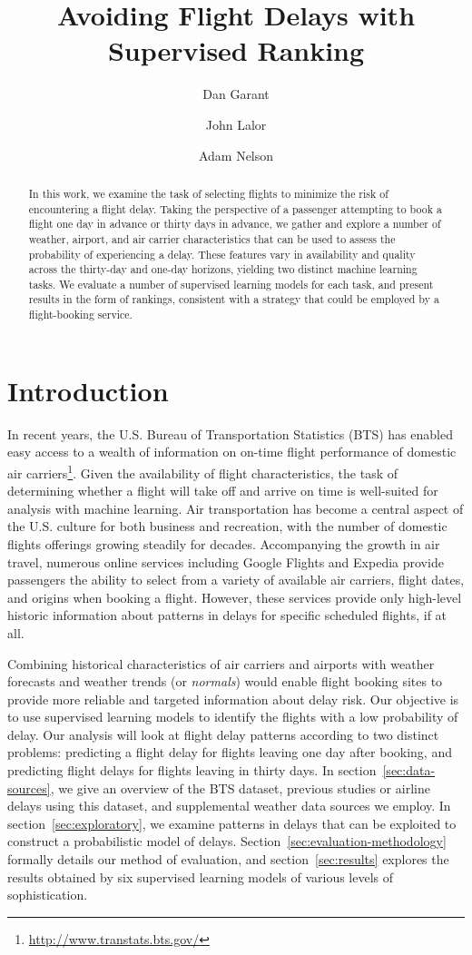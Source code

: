 \documentclass[twocolumn]{article}
\title{Avoiding Flight Delays with Supervised Ranking}
\author{Dan Garant \and John Lalor \and Adam Nelson}
\date{}
\begin{document}
\maketitle

\begin{abstract}
In this work, we examine the task of selecting flights to minimize the risk of encountering a flight delay.
Taking the perspective of a passenger attempting to book a flight one day in advance or thirty days in advance, we gather and explore a number of weather, airport, and air carrier characteristics that can be used to assess the probability of experiencing a delay.
These features vary in availability and quality across the thirty-day and one-day horizons, yielding two distinct machine learning tasks.
We evaluate a number of supervised learning models for each task, and present results in the form of rankings, consistent with a strategy that could be employed by a flight-booking service.
\end{abstract}

\section{Introduction}

In recent years, the U.S. Bureau of Transportation Statistics (BTS)  has enabled easy access to a wealth of information on on-time flight performance of domestic air carriers\footnote{\url{http://www.transtats.bts.gov/}}.
Given the availability of flight characteristics, the task of determining whether a flight will take off and arrive on time is well-suited for analysis with machine learning.
Air transportation has become a central aspect of the U.S. culture for both business and recreation, with the number of domestic flights offerings growing steadily for decades.
Accompanying the growth in air travel, numerous online services including Google Flights and Expedia provide passengers the ability to select from a variety of available air carriers, flight dates, and origins when booking a flight.
However, these services provide only high-level historic information about patterns in delays for specific scheduled flights, if at all.

Combining historical characteristics of air carriers and airports with weather forecasts and weather trends (or \emph{normals}) would enable flight booking sites to provide more reliable and targeted information about delay risk.
Our objective is to use supervised learning models to identify the flights with a low probability of delay. Our analysis will look at flight delay patterns according to two distinct problems: predicting a flight delay for flights leaving one day after booking, and predicting flight delays for flights leaving in thirty days.
In section~\ref{sec:data-sources}, we give an overview of the BTS dataset, previous studies or airline delays using this dataset, and supplemental weather data sources we employ.
In section~\ref{sec:exploratory}, we examine patterns in delays that can be exploited to construct a probabilistic model of delays.
Section~\ref{sec:evaluation-methodology} formally details our method of evaluation, and section~\ref{sec:results} explores the results obtained by six supervised learning models of various levels of sophistication.
\end{document}
